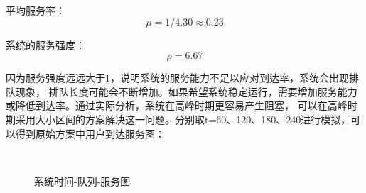 平均服务率：$$\mu = 1/4.30 \approx 0.23$$

系统的服务强度：$$\rho = 6.67 $$

因为服务强度远远大于1，说明系统的服务能力不足以应对到达率，系统会出现排队现象，
排队长度可能会不断增加。如果希望系统稳定运行，需要增加服务能力或降低到达率。通过实际分析，系统在高峰时期更容易产生阻塞，
可以在高峰时期采用大小区间的方案解决这一问题。分别取t=60、120、180、240进行模拟，可以得到原始方案中用户到达服务图：
\begin{figure}[htbp]
    \center
    \\
    \caption{系统时间-队列-服务图}\label{fig34}
\end{figure}


